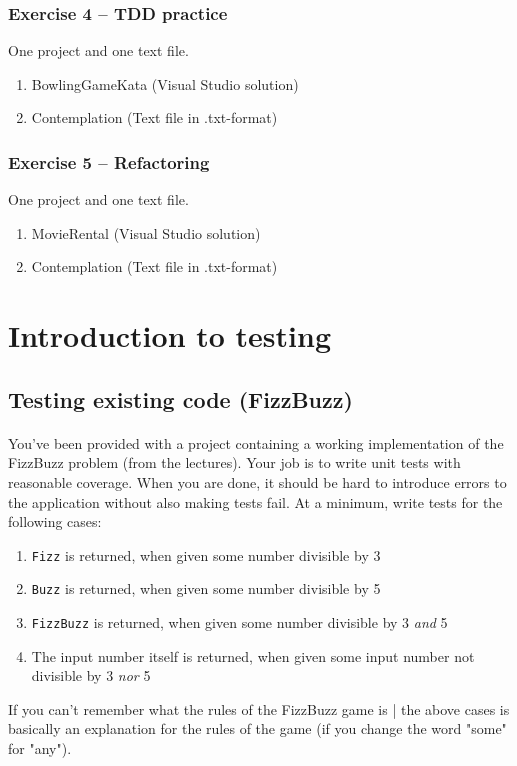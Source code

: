 \documentclass{article}
\begin{document}
\subsubsection*{Exercise 4 -- TDD practice}
One project and one text file.
\begin{enumerate}
  \item BowlingGameKata (Visual Studio solution)
  \item Contemplation (Text file in .txt-format)
\end{enumerate}

\subsubsection*{Exercise 5 -- Refactoring}
One project and one text file.
\begin{enumerate}
  \item MovieRental (Visual Studio solution)
  \item Contemplation (Text file in .txt-format)
\end{enumerate}




\pagebreak{}
  \section{Introduction to testing}
  \subsection{ Testing existing code (FizzBuzz) }
    \paragraph{}
      You've been provided with a project containing a working implementation of the FizzBuzz problem (from the lectures). Your job is to write unit tests with reasonable coverage. When you are done, it should be hard to introduce errors to the application without also making tests fail. At a minimum, write tests for the following cases:
      \begin{enumerate}
        \item \texttt{Fizz} is returned, when given some number divisible by 3
        \item \texttt{Buzz} is returned, when given some number divisible by 5
        \item \texttt{FizzBuzz} is returned, when given some number divisible by 3 \emph{and} 5
        \item The input number itself is returned, when given some input number not divisible by 3 \emph{nor} 5
      \end{enumerate}
     If you can't remember what the rules of the FizzBuzz game is | the above cases is basically an explanation for the rules of the game (if you change the word "some" for "any").
\end{document}
